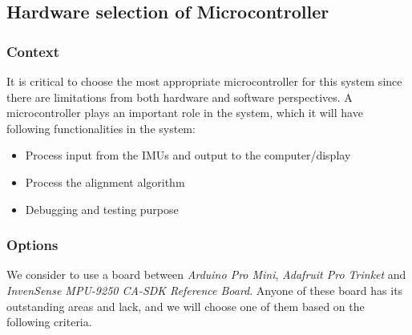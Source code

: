 


\subsection{Hardware selection of Microcontroller}
\subsubsection{Context}
It is critical to choose the most appropriate microcontroller for this system since there are limitations from both hardware and software perspectives.
A microcontroller plays an important role in the system, which it will have following functionalities in the system:

\begin{itemize}
	\item Process input from the IMUs and output to the computer/display
	\item Process the alignment algorithm
	\item Debugging and testing purpose\\
\end{itemize}

\subsubsection{Options}
We consider to use a board between \textit{Arduino Pro Mini}\cite{arduino}, \textit{Adafruit Pro Trinket}\cite{trinket} and \textit{InvenSense MPU-9250 CA-SDK Reference Board}\cite{MPU9250SDK}.
Anyone of these board has its outstanding areas and lack, and we will choose one of them based on the following criteria.\\

